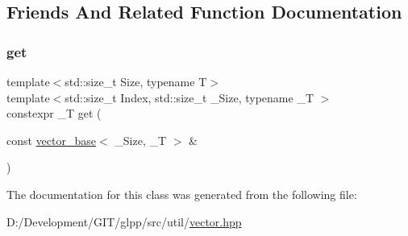 \subsection{Friends And Related Function Documentation}
\mbox{\label{classglpp_1_1vector__base_aaea1b1e4a7275fde6872c5c5395d11db}} 
\subsubsection{\texorpdfstring{get}{get}}
{\footnotesize\ttfamily template$<$std\+::size\+\_\+t Size, typename T$>$ \\
template$<$std\+::size\+\_\+t Index, std\+::size\+\_\+t \+\_\+\+Size, typename \+\_\+T $>$ \\
constexpr \+\_\+T get (\begin{DoxyParamCaption}\item[{const \hyperlink{classglpp_1_1vector__base}{vector\+\_\+base}$<$ \+\_\+\+Size, \+\_\+T $>$ \&}]{ }\end{DoxyParamCaption})\hspace{0.3cm}{\ttfamily [friend]}}



The documentation for this class was generated from the following file\+:\begin{DoxyCompactItemize}
\item 
D\+:/\+Development/\+G\+I\+T/glpp/src/util/\hyperlink{vector_8hpp}{vector.\+hpp}\end{DoxyCompactItemize}
